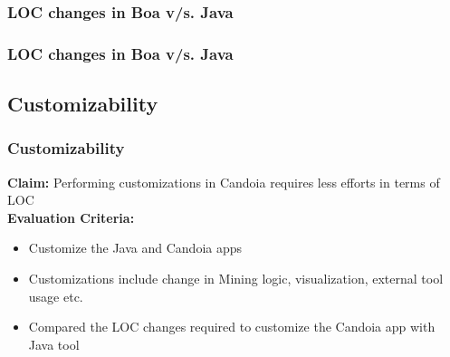         \begin{frame}
            \frametitle{LOC changes in Boa v/s. Java}
            
         \end{frame}

        \begin{frame}
            \frametitle{LOC changes in Boa v/s. Java}
            
         \end{frame}

 \subsection{Customizability}
        \begin{frame}
            \frametitle{Customizability}
            \textbf{Claim:} Performing customizations in Candoia requires less efforts in terms of LOC \\
            \textbf{Evaluation Criteria:}
            \begin{itemize}
                \item Customize the Java and Candoia apps
                \item Customizations include change in Mining logic, visualization, external tool usage etc.
                \item Compared the LOC changes required to customize the Candoia app with Java tool
            \end{itemize}
         \end{frame}

        \begin{frame}
            
         \end{frame}

        \begin{frame}
            
         \end{frame}